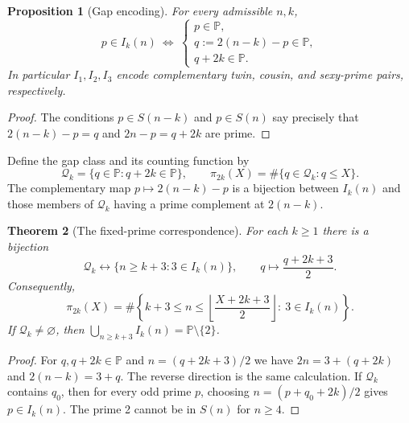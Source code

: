 \documentclass[11pt,a4paper]{article}
\newtheorem{theorem}{Theorem}[section]
\newtheorem{proposition}[theorem]{Proposition}
\theoremstyle{definition}
\newcommand{\PP}{\mathbb P}
\newcommand{\Qcal}{\mathcal Q}
\newcommand{\floor}[1]{\left\lfloor #1\right\rfloor}
\begin{document}
\begin{proposition}[Gap encoding]\label{prop:gapencoding}
For every admissible $n,k$,
\begin{equation}\label{eq:gapencoding}
 p\in I_k(n)\ \Longleftrightarrow\ 
 \begin{cases}
 p\in\PP,\\
 q:=2(n-k)-p\in\PP,\\
 q+2k\in\PP.
 \end{cases}
\end{equation}
In particular $I_1,I_2,I_3$ encode complementary twin, cousin, and sexy-prime pairs, respectively.
\end{proposition}
\begin{proof}
The conditions $p\in S(n-k)$ and $p\in S(n)$ say precisely that $2(n-k)-p=q$ and $2n-p=q+2k$ are prime.
\end{proof}

Define the gap class and its counting function by
\begin{equation}\label{eq:Qk}
 \Qcal_k=\{q\in\PP:q+2k\in\PP\},\qquad
 \pi_{2k}(X)=\#\{q\in\Qcal_k:q\le X\}.
\end{equation}
The complementary map $p\mapsto 2(n-k)-p$ is a bijection between $I_k(n)$ and those members of $\Qcal_k$ having a prime complement at $2(n-k)$.

\begin{theorem}[The fixed-prime correspondence]\label{thm:three}
For each $k\ge1$ there is a bijection
\[
 \Qcal_k\longleftrightarrow \{n\ge k+3:3\in I_k(n)\},\qquad
 q\longmapsto \frac{q+2k+3}{2}.
\]
Consequently,
\begin{equation}\label{eq:paircount}
 \pi_{2k}(X)=
 \#\left\{k+3\le n\le\floor{\frac{X+2k+3}{2}}:\ 3\in I_k(n)\right\}.
\end{equation}
If $\Qcal_k\ne\varnothing$, then
$\bigcup_{n\ge k+3}I_k(n)=\PP\setminus\{2\}$.
\end{theorem}
\begin{proof}
For $q,q+2k\in\PP$ and $n=(q+2k+3)/2$ we have $2n=3+(q+2k)$ and $2(n-k)=3+q$. The reverse direction is the same calculation. If $\Qcal_k$ contains $q_0$, then for every odd prime $p$, choosing $n=(p+q_0+2k)/2$ gives $p\in I_k(n)$. The prime 2 cannot be in $S(n)$ for $n\ge4$.
\end{proof}
\end{document}
